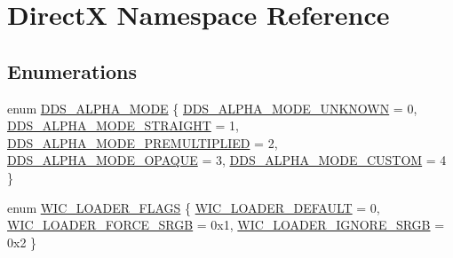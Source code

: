 \hypertarget{namespace_direct_x}{}\section{DirectX Namespace Reference}
\label{namespace_direct_x}
\subsection*{Enumerations}
\begin{DoxyCompactItemize}
\item 
enum \hyperlink{namespace_direct_x_a7cb48689d75471680c0bf7f79caaaf1f}{D\+D\+S\+\_\+\+A\+L\+P\+H\+A\+\_\+\+M\+O\+DE} \{ \newline
\hyperlink{namespace_direct_x_a7cb48689d75471680c0bf7f79caaaf1fa9cfa0bbf0542b2d5da9da93e629f50ce}{D\+D\+S\+\_\+\+A\+L\+P\+H\+A\+\_\+\+M\+O\+D\+E\+\_\+\+U\+N\+K\+N\+O\+WN} = 0, 
\hyperlink{namespace_direct_x_a7cb48689d75471680c0bf7f79caaaf1fa3c462f8d7aff2a2590d933fb1dfd6136}{D\+D\+S\+\_\+\+A\+L\+P\+H\+A\+\_\+\+M\+O\+D\+E\+\_\+\+S\+T\+R\+A\+I\+G\+HT} = 1, 
\hyperlink{namespace_direct_x_a7cb48689d75471680c0bf7f79caaaf1facdd00e8572344a8e6d3c4254607d7be8}{D\+D\+S\+\_\+\+A\+L\+P\+H\+A\+\_\+\+M\+O\+D\+E\+\_\+\+P\+R\+E\+M\+U\+L\+T\+I\+P\+L\+I\+ED} = 2, 
\hyperlink{namespace_direct_x_a7cb48689d75471680c0bf7f79caaaf1fa8de87a525290e381f32102aa6a5be7c3}{D\+D\+S\+\_\+\+A\+L\+P\+H\+A\+\_\+\+M\+O\+D\+E\+\_\+\+O\+P\+A\+Q\+UE} = 3, 
\newline
\hyperlink{namespace_direct_x_a7cb48689d75471680c0bf7f79caaaf1fab78d94eee31a6d8a3b97427e0dddb55e}{D\+D\+S\+\_\+\+A\+L\+P\+H\+A\+\_\+\+M\+O\+D\+E\+\_\+\+C\+U\+S\+T\+OM} = 4
 \}
\item 
enum \hyperlink{namespace_direct_x_ad1ef6b84995b08da5a29130bd8cc5c2a}{W\+I\+C\+\_\+\+L\+O\+A\+D\+E\+R\+\_\+\+F\+L\+A\+GS} \{ \hyperlink{namespace_direct_x_ad1ef6b84995b08da5a29130bd8cc5c2aa31db232209a0c414f3c5dd3f36fad240}{W\+I\+C\+\_\+\+L\+O\+A\+D\+E\+R\+\_\+\+D\+E\+F\+A\+U\+LT} = 0, 
\hyperlink{namespace_direct_x_ad1ef6b84995b08da5a29130bd8cc5c2aa19253126a33109ad1e9ca15710a48a71}{W\+I\+C\+\_\+\+L\+O\+A\+D\+E\+R\+\_\+\+F\+O\+R\+C\+E\+\_\+\+S\+R\+GB} = 0x1, 
\hyperlink{namespace_direct_x_ad1ef6b84995b08da5a29130bd8cc5c2aaa411d70404895e65f12c2e6f4216636c}{W\+I\+C\+\_\+\+L\+O\+A\+D\+E\+R\+\_\+\+I\+G\+N\+O\+R\+E\+\_\+\+S\+R\+GB} = 0x2
 \}
\end{DoxyCompactItemize}
